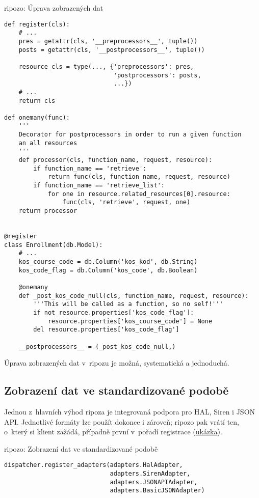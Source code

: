 \begin{listing}[htbp]
\caption{{\label{code:ripozo:modify}ripozo: Úprava zobrazených dat}}
\begin{verbatim}
def register(cls):
    # ...
    pres = getattr(cls, '__preprocessors__', tuple())
    posts = getattr(cls, '__postprocessors__', tuple())

    resource_cls = type(..., {'preprocessors': pres,
                              'postprocessors': posts,
                              ...})
    # ...
    return cls

def onemany(func):
    '''
    Decorator for postprocessors in order to run a given function
    an all resources
    '''
    def processor(cls, function_name, request, resource):
        if function_name == 'retrieve':
            return func(cls, function_name, request, resource)
        if function_name == 'retrieve_list':
            for one in resource.related_resources[0].resource:
                func(cls, 'retrieve', request, one)
    return processor


@register
class Enrollment(db.Model):
    # ...
    kos_course_code = db.Column('kos_kod', db.String)
    kos_code_flag = db.Column('kos_code', db.Boolean)

    @onemany
    def _post_kos_code_null(cls, function_name, request, resource):
        '''This will be called as a function, so no self!'''
        if not resource.properties['kos_code_flag']:
            resource.properties['kos_course_code'] = None
        del resource.properties['kos_code_flag']

    __postprocessors__ = (_post_kos_code_null,)
\end{verbatim}
\end{listing}

Úprava zobrazených dat v~ripozu je možná, systematická a jednoduchá.

\subsection{Zobrazení dat ve standardizované podobě}\label{zobrazenuxed-dat-ve-standardizovanuxe9-podobux11b}

Jednou z~hlavních výhod ripoza je integrovaná podpora pro HAL, Siren i JSON API. Jednotlivé formáty lze použít dokonce i zároveň; ripozo pak vrátí ten, o~který si klient zažádá, případně první v~pořadí registrace (\protect\hyperlink{code:ripozo:standard}{ukázka}).

\begin{listing}[htbp]
\caption{{\label{code:ripozo:standard}ripozo: Zobrazení dat ve standardizované podobě}}
\begin{verbatim}
dispatcher.register_adapters(adapters.HalAdapter,
                             adapters.SirenAdapter,
                             adapters.JSONAPIAdapter,
                             adapters.BasicJSONAdapter)
\end{verbatim}
\end{listing}

